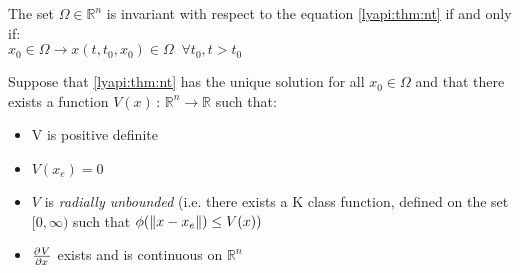 {
    The set $\Omega \in \mathbb{R}^{n}$ is invariant with respect to the equation \ref{lyapi:thm:nt} if and only if:\\
    $x_0 \in \Omega \rightarrow x(t,t_0,x_0) \in \Omega \; \; \forall t_0, t>t_0 $
}
\thm{}
{
    Suppose that \ref{lyapi:thm:nt} has the unique solution for all $x_0 \in \Omega$ and that there exists a function $V(x)\,:\,\mathbb{R}^{n} \longrightarrow \mathbb{R} $ such that:
    \begin{itemize}
            \item V is positive definite
            \item $V(x_e) = 0$ 
            \item $V$ is \textit{radially unbounded} (i.e. there exists a K class function, defined on the set $[0,\infty)$ such that  $\phi(\lVert x-x_e\rVert) \le V(x))$
        \item $\frac{\partial^{}V}{\partial x^{}}$ exists and is continuous on $\mathbb{R}^{n}$ 

            
    \end{itemize}
}



